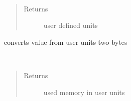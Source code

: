 \documentclass[letterpaper,10pt,english]{sphinxmanual}
\begin{document}
\begin{fulllineitems}

\begin{fulllineitems}
\label{RRtoolbox.lib:RRtoolbox.lib.cache.ResourceManager.unit}~\begin{quote}\begin{description}
\item[{Returns}] \leavevmode
user defined units

\end{description}\end{quote}

\end{fulllineitems}


\begin{fulllineitems}
\label{RRtoolbox.lib:RRtoolbox.lib.cache.ResourceManager.units2bytes}
converts value from user units two bytes

\end{fulllineitems}


\begin{fulllineitems}
\label{RRtoolbox.lib:RRtoolbox.lib.cache.ResourceManager.usedMemory}~\begin{quote}\begin{description}
\item[{Returns}] \leavevmode
used memory in user units

\end{description}\end{quote}

\end{fulllineitems}


\end{fulllineitems}

\end{document}
